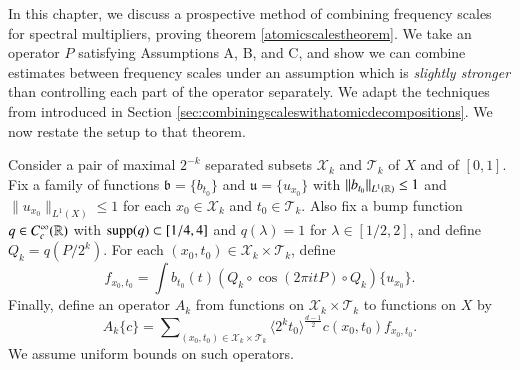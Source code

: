 
In this chapter, we discuss a prospective method of combining frequency scales for spectral multipliers, proving theorem \ref{atomicscalestheorem}. We take an operator $P$ satisfying Assumptions A, B, and C, and show we can combine estimates between frequency scales under an assumption which is \emph{slightly stronger} than controlling each part of the operator separately. We adapt the techniques from \cite{HeoandNazarovandSeeger2} introduced in Section \ref{sec:combiningscaleswithatomicdecompositions}. We now restate the setup to that theorem.

Consider a pair of maximal $2^{-k}$ separated subsets $\mathcal{X}_k$ and $\mathcal{T}_k$ of $X$ and of $[0,1]$. Fix a family of functions $\mathfrak{b} = \{ b_{t_0} \}$ and $\mathfrak{u} = \{ u_{x_0} \}$ with $\| b_{t_0} \|_{L^1(\operatorname{\mathbb{R}})} \leq 1$ and $\| u_{x_0} \|_{L^1(X)} \leq 1$ for each $x_0 \in \mathcal{X}_k$ and $t_0 \in \mathcal{T}_k$. Also fix a bump function $q \in C_c^\infty(\operatorname{\mathbb{R}})$ with $\operatorname{\text{supp}}(q) \subset [1/4,4]$ and $q(\lambda) = 1$ for $\lambda \in [1/2,2]$, and define $Q_k = q(P/2^k)$. For each $(x_0,t_0) \in \mathcal{X}_k \times \mathcal{T}_k$, define
%
\[ f_{x_0,t_0} = \int b_{t_0}(t) (Q_k \circ \cos(2 \pi i t P) \circ Q_k) \{ u_{x_0} \}. \]
%
Finally, define an operator $A_k$ from functions on $\mathcal{X}_k \times \mathcal{T}_k$ to functions on $X$ by
%
\[ A_k \{ c \} = \sum\nolimits_{(x_0,t_0) \in \mathcal{X}_k \times \mathcal{T}_k} \langle 2^k t_0 \rangle^{\frac{d-1}{2}} c(x_0,t_0) f_{x_0,t_0}. \]
%
We assume uniform bounds on such operators.\\

\noindent {}\\

